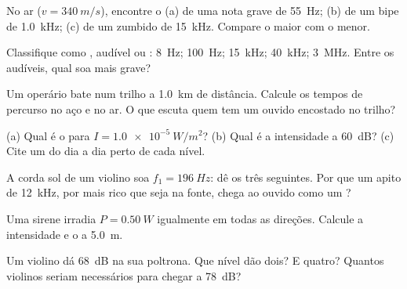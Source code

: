 \begin{exercise}[$\star$]\label{exo:g12:sound-acoustics:1}
No ar ($v = \qty{340}{m/s}$), encontre o  (a) de uma
nota grave de \qty{55}{Hz}; (b) de um bipe de \qty{1.0}{kHz}; (c) de um
zumbido de \qty{15}{kHz}. Compare o maior com o menor.
\end{exercise}

\begin{exercise}[$\star$]\label{exo:g12:sound-acoustics:2}
Classifique como ,  audível ou : \qty{8}{Hz};
\qty{100}{Hz}; \qty{15}{kHz}; \qty{40}{kHz}; \qty{3}{MHz}. Entre os
audíveis, qual soa mais grave?
\end{exercise}

\begin{exercise}[$\star$]\label{exo:g12:sound-acoustics:3}
Um operário bate num trilho a \qty{1.0}{km} de distância. Calcule os
tempos de percurso no aço e no ar. O que escuta quem tem um ouvido
encostado no trilho?
\end{exercise}

\begin{exercise}[$\star$]\label{exo:g12:sound-acoustics:4}
(a) Qual é o  para $I = \qty{1.0e-5}{W/m^2}$? (b) Qual é a
intensidade a \qty{60}{dB}? (c) Cite um  do dia a dia perto de cada
nível.
\end{exercise}

\begin{exercise}[$\star$]\label{exo:g12:sound-acoustics:5}
A corda sol de um violino soa $f_1 = \qty{196}{Hz}$: dê os três
 seguintes. Por que um apito de \qty{12}{kHz}, por mais rico
que seja na fonte, chega ao ouvido como um ?
\end{exercise}

\begin{exercise}[$\star\star$]\label{exo:g12:sound-acoustics:6}
Uma sirene irradia $P = \qty{0.50}{W}$ igualmente em todas as direções.
Calcule a intensidade e o  a \qty{5.0}{m}.
\end{exercise}

\begin{exercise}[$\star\star$]\label{exo:g12:sound-acoustics:7}
Um violino dá \qty{68}{dB} na sua poltrona. Que nível dão dois? E
quatro? Quantos violinos seriam necessários para chegar a \qty{78}{dB}?
\end{exercise}

